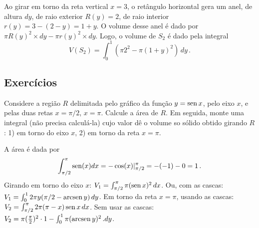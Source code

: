 \begin{ex}
\begin{center}
\begin{bmlimage}\end{bmlimage}
\end{center}
Ao girar em torno da reta vertical $x=3$, o retângulo horizontal gera um
anel, de altura $dy$, de raio exterior $R(y)=2$, de raio
interior $r(y)=3-(2-y)=1+y$. O volume desse anel é dado por 
$\pi R(y)^2 \times dy-\pi r(y)^2\times dy$. Logo, o volume de
$S_2$ é dado pela integral
$$
V(S_2)=\int_0^1 (\pi 2^2-\pi (1+y)^2)\,dy\,.
$$

\end{ex}

\subsection{Exercícios}

\begin{exo}
Considere a região $R$ delimitada pelo gráfico da função $y=\operatorname{sen} x$,
pelo eixo $x$, e pelas duas retas $x=\pi/2$, $x=\pi$.
Calcule a área de $R$. Em seguida,
monte uma integral (não precisa calculá-la) cujo valor dê o volume so sólido
obtido girando $R$: 1) em torno do eixo $x$, 2) em torno da reta $x=\pi$.
\begin{sol}
A área é dada por 
$$\int_{\pi/2}^\pi\operatorname{sen} (x)dx=-\cos (x)|^{\pi}_{\pi/2}=-(-1)-0=1\,.$$
Girando em torno do eixo $x$:
$V_1=\int_{\pi/2}^{\pi}\pi(\operatorname{sen} x)^2\,dx$.
Ou, com as cascas: $V_1=\int_0^12\pi y (\pi/2-\operatorname{arcsen} y)\,dy$.
Em torno da reta $x=\pi$, usando as cascas:
$V_2=\int_{\pi/2}^\pi2\pi(\pi-x)\operatorname{sen} x\,dx$.
Sem usar as cascas:
$V_2=\pi(\tfrac{\pi}{2})^2\cdot 1-\int_0^1\pi (\operatorname{arcsen} y)^2\,.dy$.
\end{sol}
\end{exo}

